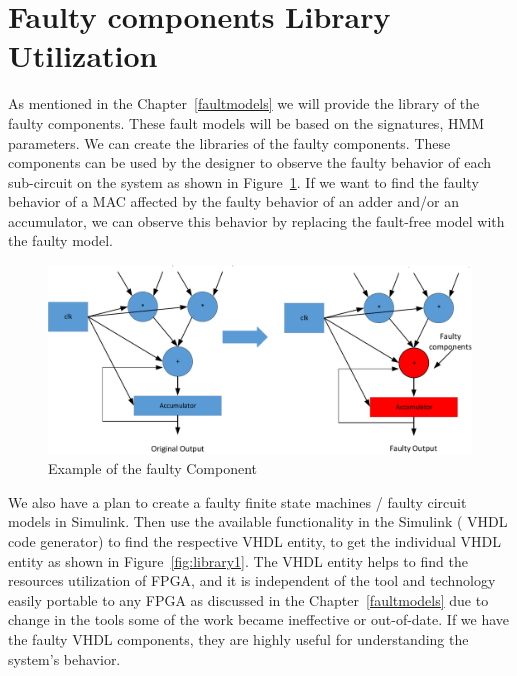 \section{Faulty components Library Utilization}
As mentioned in the Chapter~\ref{faultmodels} we will provide the library of the faulty components. These fault models will be based on the signatures, HMM parameters. We can create the libraries of the faulty components. These components can be used by the designer to observe the faulty behavior of each sub-circuit on the system as shown in Figure~\ref{fig:lib1}.  If we want to find the faulty behavior of a MAC affected by the faulty behavior of an adder and/or an accumulator, we can observe this behavior by replacing the fault-free model with the faulty model.
\begin{figure}[tb!]
 \centering
  \captionsetup{justification=centering}    
   \includegraphics[scale=0.8]{Figures/MAC.pdf}
   \caption{Example of the faulty Component}
\label{fig:lib1}
\end{figure}
We also have a plan to create a faulty finite state machines / faulty circuit models in Simulink. Then use the available functionality in the Simulink ( VHDL code generator) to find the respective VHDL entity, to get the individual VHDL entity as shown in Figure~\ref{fig:library1}. The VHDL entity helps to find the resources utilization of FPGA, and it is independent of the tool and technology easily portable to any FPGA as discussed in the Chapter~\ref{faultmodels} due to change in the tools some of the work became ineffective or out-of-date. If we have the faulty VHDL components, they are highly useful for understanding the system's behavior.
%

